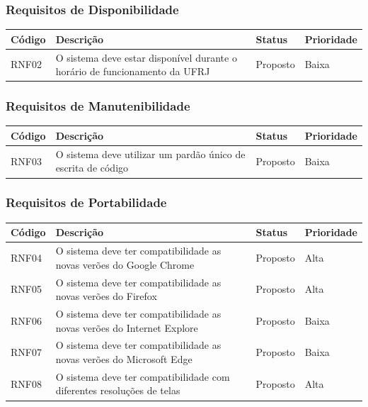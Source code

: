 \documentclass[a4paper, 12pt]{article}
\begin{document}
\subsubsection{Requisitos de Disponibilidade}
\begin{table}[ht]
	\centering

	\begin{tabular}{p{2cm}p{7cm}p{2cm}p{2cm}}
		\hline
		\cellcolor{gray}Código&\cellcolor{gray}Descrição&\cellcolor{gray}Status&\cellcolor{gray}Prioridade  \\
		\hline
		RNF02&O sistema deve estar dispon\'{i}vel durante o hor\'{a}rio de funcionamento da UFRJ&Proposto&Baixa\\
		\hline
	\end{tabular}
\end{table}%
\subsubsection{Requisitos de Manutenibilidade}
\begin{table}[ht]
	\rowcolors{1}{}{}
	\centering

	\begin{tabular}{p{2cm}p{7cm}p{2cm}p{2cm}}
		\hline
		\cellcolor{gray}Código&\cellcolor{gray}Descrição&\cellcolor{gray}Status&\cellcolor{gray}Prioridade  \\
		\hline
		RNF03&O sistema deve utilizar um pard\~{a}o \'{u}nico de escrita de c\'{o}digo&Proposto&Baixa\\
		\hline
	\end{tabular}
\end{table}%
\subsubsection{Requisitos de Portabilidade}
\begin{table}[ht]
	\centering

	\begin{tabular}{p{2cm}p{7cm}p{2cm}p{2cm}}
		\hline
		\cellcolor{gray}Código&\cellcolor{gray}Descrição&\cellcolor{gray}Status&\cellcolor{gray}Prioridade  \\
		\hline
		RNF04&O sistema deve ter compatibilidade as novas ver\~{o}es do Google Chrome&Proposto&Alta\\
        RNF05&O sistema deve ter compatibilidade as novas ver\~{o}es do Firefox&Proposto&Alta\\
        RNF06&O sistema deve ter compatibilidade as novas ver\~{o}es do Internet Explore&Proposto&Baixa\\
        RNF07&O sistema deve ter compatibilidade as novas ver\~{o}es do Microsoft Edge&Proposto&Baixa\\
        RNF08&O sistema deve ter compatibilidade com diferentes resolu\c{c}\~{o}es de telas&Proposto&Alta\\
		\hline
	\end{tabular}
\end{table}%
\newpage
\end{document}
